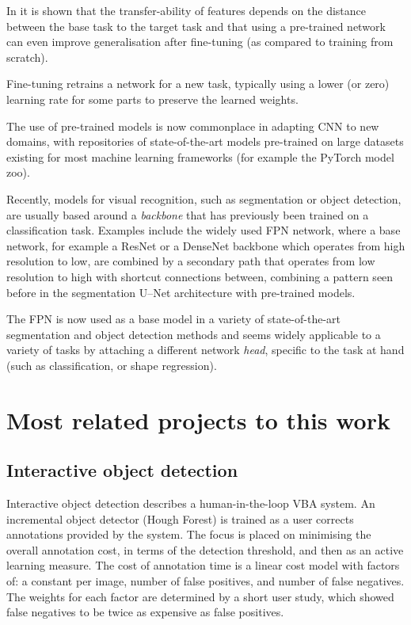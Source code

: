 In \cite{Yosinski} it is shown that the transfer-ability of features depends on the distance between the base task to the target task and that using a pre-trained network can even improve generalisation after fine-tuning (as compared to training from scratch).

Fine-tuning retrains a network for a new task, typically using a lower (or zero) learning rate for some parts to preserve the learned weights. 

The use of pre-trained models is now commonplace in adapting \gls{CNN} to new domains, with repositories of state-of-the-art models pre-trained on large datasets existing for most machine learning frameworks (for example the PyTorch \cite{Paszke2017} model zoo). 

Recently, models for visual recognition, such as segmentation or object detection, are usually based around a \emph{backbone} that has previously been trained on a classification task. Examples include the widely used \gls{FPN} network, \cite{Lin2017a} where a base network, for example a ResNet \cite{He} or a DenseNet \cite{Huang2016} backbone which operates from high resolution to low, are combined by a secondary path that operates from low resolution to high with shortcut connections between, combining a pattern seen before in the segmentation U--Net \cite{Ronneberger2015} architecture with pre-trained models.

The \gls{FPN} is now used as a base model in a variety of state-of-the-art segmentation and object detection methods and seems widely applicable to a variety of tasks by attaching a different network \emph{head}, specific to the task at hand (such as classification, or shape regression).

\section {Most related projects to this work}
\label{sec:closest}

\subsection {Interactive object detection \cite{Yao2012}}

Interactive object detection \cite{Yao2012} describes a human-in-the-loop \gls{VBA} system. An incremental object detector (Hough Forest) is trained as a user corrects annotations provided by the system. The focus is placed on minimising the overall annotation cost, in terms of the detection threshold, and then as an active learning measure. 
The cost of annotation time is a linear cost model with factors of: a constant per image, number of false positives, and number of false negatives. The weights for each factor are determined by a short user study, which showed false negatives to be twice as expensive as false positives. 

